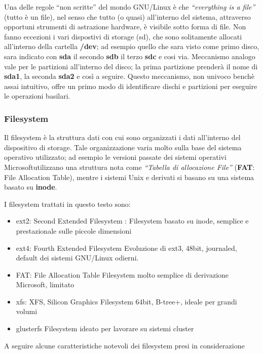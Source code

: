 Una delle regole ``non scritte'' del mondo GNU/Linux è che \textit{``everything is a file''} (tutto è un file), nel senso che tutto (o quasi) all'interno del sistema, attraverso opportuni strumenti di astrazione hardware, è visibile sotto forma di file. 
Non fanno eccezioni i vari dispostivi di storage (sd), che sono solitamente allocati all'interno della cartella \textbf{/dev}; ad esempio quello che sara visto come primo disco, sara indicato con \textbf{sda} il secondo \textbf{sdb} il terzo \textbf{sdc} e cosi via.
Meccanismo analogo vale per le partizioni all'interno del disco; la prima partizione prenderà il nome di \textbf{sda1}, la seconda \textbf{sda2} e così a seguire. 
Questo meccanismo, non univoco benchè assai intuitivo, offre un primo modo di identificare dischi e partizioni per eseguire le operazioni basilari.

\subsubsection{Filesystem}

Il filesystem è la struttura dati con cui sono organizzati i dati all'interno del dispositivo di storage. Tale organizzazione varia molto sulla base del sistema operativo utilizzato; ad esempio le versioni passate dei sistemi operativi Microsoft\textregistered utilizzano una struttura nota come \textit{``Tabella di allocazione File''} (\textbf{FAT}: File Allocation Table), mentre i sistemi Unix e derivati si basano su una sistema basato su \textbf{inode}. 

I filesystem trattati in questo testo sono:

\begin{itemize}
 \item ext2: Second Extended Filesystem
 \subitem: Filesystem basato su inode, semplice e prestazionale sulle piccole dimensioni 
 \item ext4: Fourth Extended Filesystem
 \subitem Evoluzione di ext3, 48bit, journaled, default dei sistemi GNU/Linux odierni.
 \item FAT: File Allocation Table
 \subitem Filesystem molto semplice di derivazione Microsoft\textregistered, limitato
 \item xfs: XFS, Silicon Graphics
 \subitem Filesystem 64bit, B-tree+, ideale per grandi volumi
 \item glusterfs
 \subitem Filesystem ideato per lavorare su sistemi cluster
\end{itemize}

A seguire alcune caratteristiche notevoli dei filesystem presi in considerazione

